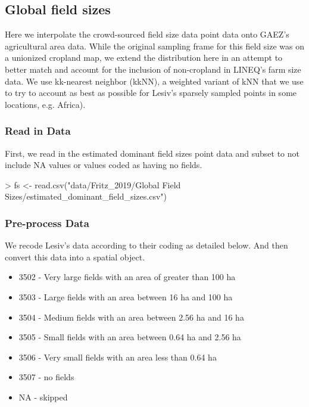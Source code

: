 \documentclass{article}
\begin{document}
\subsection{Global field sizes}

Here we interpolate the crowd-sourced field size data point data onto GAEZ's agricultural area data. While the original sampling frame for this field size was on a unionized cropland map, we extend the distribution here in an attempt to better match and account for the inclusion of non-cropland in LINEQ's farm size data. We use kk-nearest neighbor (kkNN), a weighted variant of kNN that we use to try to account as best as possible for Lesiv’s sparsely sampled points in some locations, e.g. Africa).

\subsubsection{Read in Data}

First, we read in the estimated dominant field sizes point data and subset to not include NA values or values coded as having no fields.
\begin{Schunk}
\begin{Sinput}
> fs <- read.csv("data/Fritz_2019/Global Field Sizes/estimated_dominant_field_sizes.csv")
\end{Sinput}
\end{Schunk}

\subsubsection{Pre-process Data}

We recode Lesiv's data according to their coding as detailed below. And then convert this data into a spatial object.

\begin{itemize}
  \item 3502 - Very large fields with an area of greater than 100 ha
  \item 3503 - Large fields with an area between 16 ha and 100 ha
  \item 3504 - Medium fields with an area between 2.56 ha and 16 ha
  \item 3505 - Small fields with an area between 0.64 ha and 2.56 ha
  \item 3506 - Very small fields with an area less than 0.64 ha
  \item 3507 - no fields
  \item NA - skipped
\end{itemize}
\end{document}
